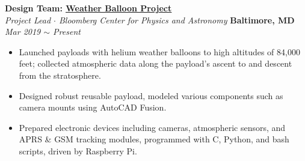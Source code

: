 \documentclass[10pt, letterpaper]{article}
\begin{document}
\begin{paracol}{2}
	\textbf{Design Team: \href{https://nearspace.jhu.edu/}{\underline{Weather Balloon Project}}}\\
	\textit{Project Lead $\cdot$ Bloomberg Center for Physics and Astronomy}
	\switchcolumn
	\raggedleft\textbf{Baltimore, MD}\\
	\raggedleft\textit{Mar 2019 $\sim$ Present}
\end{paracol}\vspace{-5mm}
\begin{itemize}
	\item  Launched payloads with helium weather balloons to high altitudes of 84,000 feet; collected atmospheric data along the payload's ascent to and descent from the stratosphere.\vspace{-3mm}
		\item Designed robust reusable payload, modeled various components such as camera mounts using AutoCAD Fusion.\vspace{-3mm}
	\item Prepared electronic devices including cameras, atmospheric sensors, and APRS \& GSM tracking modules, programmed with C, Python, and bash scripts, driven by Raspberry Pi.
\end{itemize}
\vspace{-3mm} 
\end{document}
